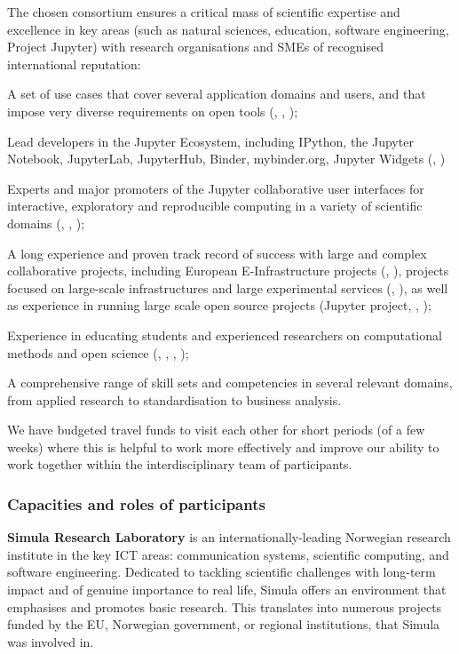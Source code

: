 The chosen consortium ensures a critical mass of scientific expertise and
excellence in key areas (such as natural sciences, education, software
engineering, Project Jupyter) with research organisations and SMEs of recognised
international reputation:
\begin{compactitem}
\item A set of use cases that cover several application domains and users, and that impose very diverse
requirements on open tools (, , );
\item Lead developers in the Jupyter Ecosystem, including IPython, the Jupyter Notebook, JupyterLab,
JupyterHub, Binder, mybinder.org, Jupyter Widgets (, )
\item Experts and major promoters of the Jupyter collaborative user interfaces
  for interactive, exploratory and reproducible computing in a variety of scientific domains (, , );
\item A long experience and proven track record of success with large and complex collaborative projects,
including European E-Infrastructure projects (, ),
projects focused on large-scale infrastructures and large experimental services (, ),
as well as experience in running large scale open source projects (Jupyter
project, , );
\item Experience in educating students and experienced researchers on
  computational methods and open science (, , , );
\item A comprehensive range of skill sets and competencies in several relevant domains,
from applied research to standardisation to business analysis.
\end{compactitem}

We have budgeted travel funds to visit each other for short periods (of a few
weeks) where this is helpful to work more effectively and improve our ability to
work together within the interdisciplinary team of participants.

\subsubsection{Capacities and roles of participants}

\noindent \textbf{Simula Research Laboratory}
 is an internationally-leading Norwegian research institute in the key
ICT areas: communication systems, scientific computing, and software
engineering. Dedicated to tackling scientific challenges with long-term impact and of
genuine importance to real life, Simula offers an environment that emphasises
and promotes basic research. This translates into numerous projects funded by
the EU, Norwegian government, or regional institutions, that Simula was
involved in.

